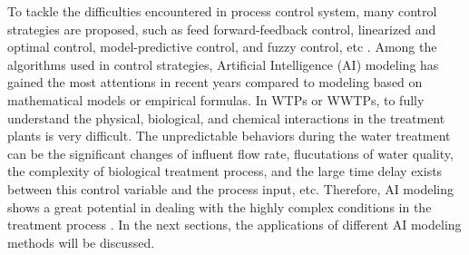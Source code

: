 To tackle the difficulties encountered in process control system, many control strategies are proposed, such as feed forward-feedback control, linearized and optimal control, model-predictive control, and fuzzy control, etc \citep{demirFeedbackControlChlorine2014a}. Among the algorithms used in control strategies, Artificial Intelligence (AI) modeling has gained the most attentions in recent years compared to modeling based on mathematical models or empirical formulas. In WTPs or WWTPs, to fully understand the physical, biological, and chemical interactions in the treatment plants is very difficult. The unpredictable behaviors during the water treatment can be the significant changes of influent flow rate, flucutations of water quality, the complexity of biological treatment process, and the large time delay exists between this control variable and the process input, etc. Therefore, AI modeling shows a great potential in dealing with the highly complex conditions in the treatment process \citet{liRecentAdvancesArtificial2021}. In the next sections, the applications of different AI modeling methods will be discussed.

